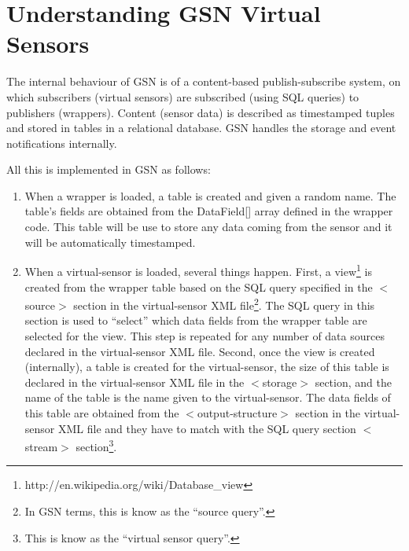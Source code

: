 
\section{Understanding GSN Virtual Sensors}
\label{sec:vsp}
The internal behaviour of GSN is of a content-based publish-subscribe
system, on which subscribers (virtual sensors) are subscribed (using
SQL queries) to publishers (wrappers). Content (sensor data) is
described as timestamped tuples and stored in tables in a relational
database.  GSN handles the storage and event notifications internally.

All this is implemented in GSN as follows:

\begin{enumerate}
	\item When a wrapper is loaded, a table is created and given a random name.
The table's fields are obtained from the DataField[] array defined in
the wrapper code. This table will be use to store any data coming from
the sensor and it will be automatically timestamped.
	\item When a virtual-sensor is loaded, several things happen. First, a
view\footnote{http://en.wikipedia.org/wiki/Database\_view

} is created from the wrapper table based on the SQL query specified
in the \begin{math}<\end{math}source\begin{math}>\end{math} section in
the virtual-sensor XML file\footnote{ In GSN terms, this is know as the
\textquotedblleft{}source query\textquotedblright{}.

}.  The SQL query in this section is used to
\textquotedblleft{}select\textquotedblright{} which data fields from
the wrapper table are selected for the view. This step is repeated for
any number of data sources declared in the virtual-sensor XML file.
Second, once the view is created (internally), a table is created for
the virtual-sensor, the size of this table is declared in the
virtual-sensor XML file in the
\begin{math}<\end{math}storage\begin{math}>\end{math} section, and the
name of the table is the name given to the virtual-sensor. The data
fields of this table are obtained from the
\begin{math}<\end{math}output-structure\begin{math}>\end{math} section
in the virtual-sensor XML file and they have to match with the SQL
query section \begin{math}<\end{math}stream\begin{math}>\end{math}
section\footnote{This is know as the \textquotedblleft{}virtual sensor
query\textquotedblright{}.

}.
\end{enumerate}




